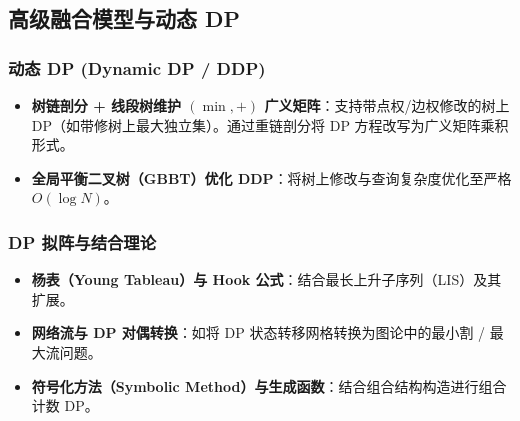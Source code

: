 \subsection{高级融合模型与动态 DP}

\subsubsection{动态 DP (Dynamic DP / DDP)}
\begin{itemize}
    \item \textbf{树链剖分 + 线段树维护 $(\min, +)$ 广义矩阵}：支持带点权/边权修改的树上 DP（如带修树上最大独立集）。通过重链剖分将 DP 方程改写为广义矩阵乘积形式。
    \item \textbf{全局平衡二叉树（GBBT）优化 DDP}：将树上修改与查询复杂度优化至严格 $O(\log N)$。
\end{itemize}

\subsubsection{DP 拟阵与结合理论}
\begin{itemize}
    \item \textbf{杨表（Young Tableau）与 Hook 公式}：结合最长上升子序列（LIS）及其扩展。
    \item \textbf{网络流与 DP 对偶转换}：如将 DP 状态转移网格转换为图论中的最小割 / 最大流问题。
    \item \textbf{符号化方法（Symbolic Method）与生成函数}：结合组合结构构造进行组合计数 DP。
\end{itemize}